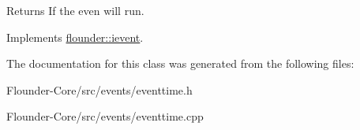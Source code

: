 \begin{DoxyReturn}{Returns}
If the even will run. 
\end{DoxyReturn}


Implements \hyperlink{classflounder_1_1ievent_a7017c8803df2397758980cb61020e801}{flounder\+::ievent}.



The documentation for this class was generated from the following files\+:\begin{DoxyCompactItemize}
\item 
Flounder-\/\+Core/src/events/eventtime.\+h\item 
Flounder-\/\+Core/src/events/eventtime.\+cpp\end{DoxyCompactItemize}
